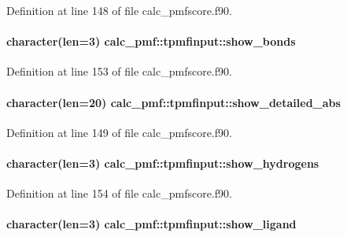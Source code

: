 Definition at line 148 of file calc\-\_\-pmfscore.\-f90.

\hypertarget{structcalc__pmf_1_1tpmfinput_ab06e8adc83f49d2e29b12635267d05fc}{
\paragraph[{show\-\_\-bonds}]{\setlength{\rightskip}{0pt plus 5cm}character(len=3) calc\-\_\-pmf\-::tpmfinput\-::show\-\_\-bonds}}\label{structcalc__pmf_1_1tpmfinput_ab06e8adc83f49d2e29b12635267d05fc}


Definition at line 153 of file calc\-\_\-pmfscore.\-f90.

\hypertarget{structcalc__pmf_1_1tpmfinput_abdfb3edfb37176ea484f3b5210442261}{
\paragraph[{show\-\_\-detailed\-\_\-abs}]{\setlength{\rightskip}{0pt plus 5cm}character(len=20) calc\-\_\-pmf\-::tpmfinput\-::show\-\_\-detailed\-\_\-abs}}\label{structcalc__pmf_1_1tpmfinput_abdfb3edfb37176ea484f3b5210442261}


Definition at line 149 of file calc\-\_\-pmfscore.\-f90.

\hypertarget{structcalc__pmf_1_1tpmfinput_ae5dd952594b8fc620f792a47474bf724}{
\paragraph[{show\-\_\-hydrogens}]{\setlength{\rightskip}{0pt plus 5cm}character(len=3) calc\-\_\-pmf\-::tpmfinput\-::show\-\_\-hydrogens}}\label{structcalc__pmf_1_1tpmfinput_ae5dd952594b8fc620f792a47474bf724}


Definition at line 154 of file calc\-\_\-pmfscore.\-f90.

\hypertarget{structcalc__pmf_1_1tpmfinput_a8afeb6f4281fa01218b99de652f3c80f}{
\paragraph[{show\-\_\-ligand}]{\setlength{\rightskip}{0pt plus 5cm}character(len=3) calc\-\_\-pmf\-::tpmfinput\-::show\-\_\-ligand}}\label{structcalc__pmf_1_1tpmfinput_a8afeb6f4281fa01218b99de652f3c80f}


